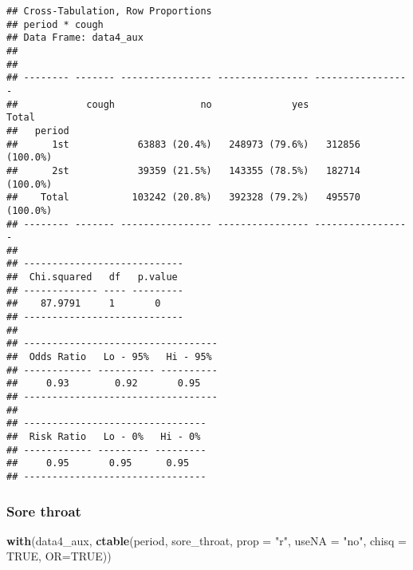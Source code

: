 \documentclass[
]{article}
\newenvironment{Shaded}{\begin{snugshade}}{\end{snugshade}}
\newcommand{\DataTypeTok}[1]{\textcolor[rgb]{0.13,0.29,0.53}{#1}}
\newcommand{\KeywordTok}[1]{\textcolor[rgb]{0.13,0.29,0.53}{\textbf{#1}}}
\newcommand{\NormalTok}[1]{#1}
\newcommand{\OtherTok}[1]{\textcolor[rgb]{0.56,0.35,0.01}{#1}}
\newcommand{\StringTok}[1]{\textcolor[rgb]{0.31,0.60,0.02}{#1}}
\begin{document}
\begin{verbatim}
## Cross-Tabulation, Row Proportions  
## period * cough  
## Data Frame: data4_aux  
## 
## 
## -------- ------- ---------------- ---------------- -----------------
##            cough               no              yes             Total
##   period                                                            
##      1st            63883 (20.4%)   248973 (79.6%)   312856 (100.0%)
##      2st            39359 (21.5%)   143355 (78.5%)   182714 (100.0%)
##    Total           103242 (20.8%)   392328 (79.2%)   495570 (100.0%)
## -------- ------- ---------------- ---------------- -----------------
## 
## ----------------------------
##  Chi.squared   df   p.value 
## ------------- ---- ---------
##    87.9791     1       0    
## ----------------------------
## 
## ----------------------------------
##  Odds Ratio   Lo - 95%   Hi - 95% 
## ------------ ---------- ----------
##     0.93        0.92       0.95   
## ----------------------------------
## 
## --------------------------------
##  Risk Ratio   Lo - 0%   Hi - 0% 
## ------------ --------- ---------
##     0.95       0.95      0.95   
## --------------------------------
\end{verbatim}

\hypertarget{sore-throat-1}{%
\subsubsection{Sore throat}\label{sore-throat-1}}

\begin{Shaded}
\begin{Highlighting}[]
\KeywordTok{with}\NormalTok{(data4_aux, }\KeywordTok{ctable}\NormalTok{(period, sore_throat, }\DataTypeTok{prop =} \StringTok{"r"}\NormalTok{, }\DataTypeTok{useNA =} \StringTok{"no"}\NormalTok{, }\DataTypeTok{chisq =} \OtherTok{TRUE}\NormalTok{, }\DataTypeTok{OR=}\OtherTok{TRUE}\NormalTok{))}
\end{Highlighting}
\end{Shaded}
\end{document}
